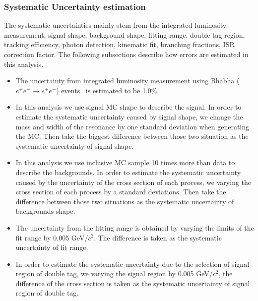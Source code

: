 \documentclass[aps,preprint,tightenlines,superscriptaddress,showpacs,byrevtex,amsmath,amssymb,nofloatfix]{revtex4}
\begin{document}
\subsubsection{Systematic Uncertainty estimation}

The systematic uncertainties mainly stem from the integrated luminosity measurement, signal shape, background shape, fitting range, double tag region, tracking efficiency, photon detection, kinematic fit, branching fractions, ISR correction factor. The following subsections describe how errors are estimated in this analysis.

\begin{itemize}

\item The uncertainty from integrated luminosity measurement using Bhabha ($e^{+}e^{-}\rightarrow e^{+}e^{-}$) events~\cite{limu_4180} is estimated to be 1.0\%.

\item In this analysis we use signal MC shape to describe the signal. In order to estimate the systematic uncertainty caused by signal shape, we change the mass and width of the resonance by one standard deviation when generating the MC. Then take the biggest difference between those two situation as the systematic uncertainty of signal shape.

\item In this analysis we use inclusive MC sample 10 times more than data to describe the backgrounds. In order to estimate the systematic uncertainty caused by the uncertainty of the cross section of each process, we varying the cross section of each process by a standard deviations. Then take the difference between those two situations as the systematic uncertainty of backgrounds shape.

\item The uncertainty from the fitting range is obtained by varying the limits of the fit range by 0.005 GeV/$c^{2}$. The difference is taken as the systematic uncertainty of fit range.

\item In order to estimate the systematic uncertainty due to the selection of signal region of double tag, we varying the signal region by 0.005 GeV/$c^{2}$, the difference of the cross section is taken as the systematic uncertainty of signal region of double tag.


\end{itemize}
\end{document}
